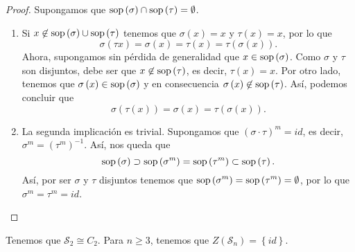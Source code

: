 \begin{proof} Supongamos que $\displaystyle \operatorname{sop}\left(\sigma \right) \cap \operatorname{sop}\left(\tau \right) = \emptyset $.
\begin{enumerate}
\item Si $\displaystyle x \not\in \operatorname{sop}\left(\sigma \right)\cup \operatorname{sop}\left(\tau \right) $ tenemos que $\displaystyle \sigma\left(x\right) = x $ y $\displaystyle \tau\left(x\right) = x $, por lo que
	\[\sigma\left(\tau x\right) = \sigma \left(x\right) = \tau\left(x\right) = \tau\left(\sigma\left(x\right)\right) .\]
	Ahora, supongamos sin pérdida de generalidad que $\displaystyle x \in \operatorname{sop}\left(\sigma \right) $. Como $\displaystyle \sigma  $ y $\displaystyle \tau $ son disjuntos, debe ser que $\displaystyle x \not\in \operatorname{sop}\left(\tau\right) $, es decir, $\displaystyle \tau\left(x\right) = x $. Por otro lado, tenemos que $\displaystyle \sigma\left(x\right) \in \operatorname{sop}\left(\sigma \right) $ y en consecuencia $\displaystyle \sigma\left(x\right) \not\in \operatorname{sop}\left(\tau\right) $. Así, podemos concluir que
	\[ \sigma\left(\tau\left(x\right)\right) = \sigma \left(x\right) = \tau\left(\sigma \left(x\right)\right) .\]
\item La segunda implicación es trivial. Supongamos que $\displaystyle \left(\sigma \cdot \tau\right)^{m} = id $, es decir, $\displaystyle \sigma^{m} = \left(\tau^{m}\right)^{-1} $. Así, nos queda que
	\[\operatorname{sop}\left(\sigma \right) \supset \operatorname{sop}\left(\sigma ^{m}\right) = \operatorname{sop}\left(\tau^{m}\right)\subset \operatorname{sop}\left(\tau\right) .\]
Así, por ser $\displaystyle \sigma  $ y $\displaystyle \tau $ disjuntos tenemos que $\displaystyle \operatorname{sop}\left(\sigma ^{m}\right) = \operatorname{sop}\left(\tau^{m}\right)= \emptyset $, por lo que $\displaystyle \sigma^{m} = \tau^{m} = id $.	
\end{enumerate}
\end{proof}
\begin{observation}
	Tenemos que $\displaystyle \mathcal{S}_{2} \cong C_{2} $. Para $\displaystyle n \geq 3 $, tenemos que $\displaystyle Z\left(\mathcal{S}_{n}\right) = \left\{ id\right\}  $. 
\end{observation}
